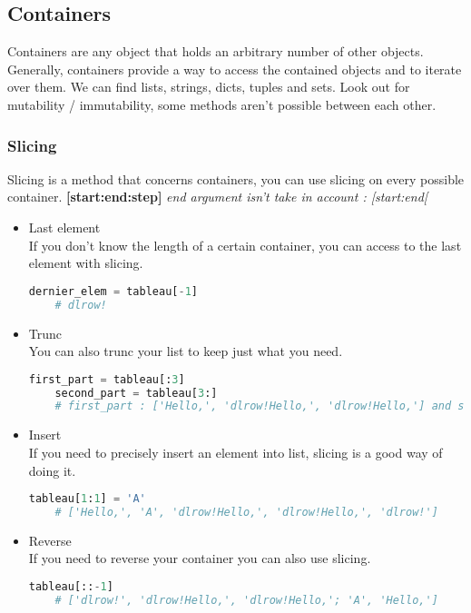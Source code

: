 \documentclass[a4paper, 12pt, titlepage]{scrartcl} %
\begin{document}
\subsection{Containers}
Containers are any object that holds an arbitrary number of other objects. Generally, containers provide a way to access the contained objects and to iterate over them. We can find lists, strings, dicts, tuples and sets. Look out for mutability / immutability, some methods aren't possible between each other. \\

\subsubsection{Slicing}
Slicing is a method that concerns containers, you can use slicing on every possible container. \textbf{[start:end:step]} \textit{end argument isn't take in account : [start:end[}
\begin{itemize}
    \item Last element \\
    If you don't know the length of a certain container, you can access to the last element with slicing.
    \begin{lstlisting}[language=Python]
    dernier_elem = tableau[-1]
    # dlrow!
    \end{lstlisting}
    
    \item Trunc \\
    You can also trunc your list to keep just what you need.
    \begin{lstlisting}[language=Python]
    first_part = tableau[:3]
    second_part = tableau[3:]
    # first_part : ['Hello,', 'dlrow!Hello,', 'dlrow!Hello,'] and second_part : ['dlrow!']
    \end{lstlisting}
    
    \item Insert \\
    If you need to precisely insert an element into list, slicing is a good way of doing it.
    \begin{lstlisting}[language=Python]
    tableau[1:1] = 'A'
    # ['Hello,', 'A', 'dlrow!Hello,', 'dlrow!Hello,', 'dlrow!']
    \end{lstlisting}
    
    \item Reverse \\
    If you need to reverse your container you can also use slicing.
    \begin{lstlisting}[language=Python]
    tableau[::-1]
    # ['dlrow!', 'dlrow!Hello,', 'dlrow!Hello,'; 'A', 'Hello,']
    \end{lstlisting}
\end{itemize}
\end{document}
